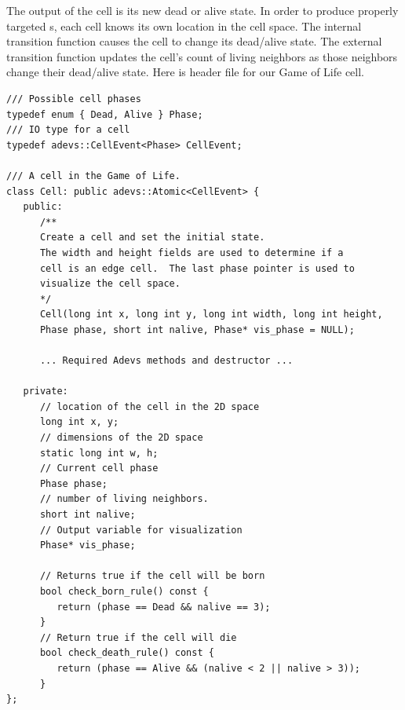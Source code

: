 The output of the cell is its new dead or alive state. In order to produce properly targeted s, each cell knows its own location in the cell space. The internal transition function causes the cell to change its dead/alive state. The external transition function updates the cell's count of living neighbors as those neighbors change their dead/alive state. Here is header file for our Game of Life cell.
\begin{verbatim}
/// Possible cell phases
typedef enum { Dead, Alive } Phase;
/// IO type for a cell
typedef adevs::CellEvent<Phase> CellEvent;

/// A cell in the Game of Life.  
class Cell: public adevs::Atomic<CellEvent> {
   public:
      /**
      Create a cell and set the initial state.
      The width and height fields are used to determine if a
      cell is an edge cell.  The last phase pointer is used to
      visualize the cell space.
      */
      Cell(long int x, long int y, long int width, long int height, 
      Phase phase, short int nalive, Phase* vis_phase = NULL);

      ... Required Adevs methods and destructor ...

   private:   
      // location of the cell in the 2D space
      long int x, y;
      // dimensions of the 2D space
      static long int w, h;
      // Current cell phase
      Phase phase;
      // number of living neighbors.
      short int nalive;
      // Output variable for visualization
      Phase* vis_phase;

      // Returns true if the cell will be born
      bool check_born_rule() const {
         return (phase == Dead && nalive == 3);
      }
      // Return true if the cell will die
      bool check_death_rule() const {
         return (phase == Alive && (nalive < 2 || nalive > 3));
      }
};
\end{verbatim}


